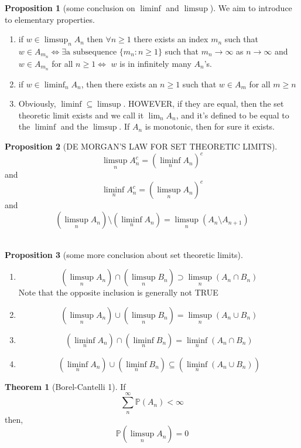 \documentclass[12pt]{article}
\theoremstyle{definition}
\newtheorem{theorem}{Theorem}[section]
\newtheorem{proposition}{Proposition}[theorem]
\begin{document}
\begin{proposition}[some conclusion on $\liminf$ and $\limsup$]
We aim to introduce to elementary properties. 
\begin{enumerate}
	\item if $w \in \limsup_{n} A_n$ then $\forall n \geq 1$ there exists an index $m_n$ such that $w \in A_{m_n} \iff \exists \text{a subsequence } \{m_n \colon n \geq 1\}$ such that $m_n \to \infty$ as $n \to \infty$ and $w \in A_{m_n}$ for all $n \geq 1 \iff$ $w$ is in infinitely many $A_n$'s. 
	\item if $w \in \liminf_{n} A_n$, then there exists an $n \geq 1$ such that $w \in A_m$ for all $m \geq n$
	\item Obviously, $\liminf \subseteq \limsup$. HOWEVER, if they are equal, then the set theoretic limit exists and we call it $\lim_n A_n$, and it's defined to be equal to the $\liminf$ and the $\limsup$. If $A_n$ is monotonic, then for sure it exists.
\end{enumerate}


	
\end{proposition}
\begin{proposition}[DE MORGAN'S LAW FOR SET THEORETIC LIMITS]
	$$\limsup_n A_n^c = (\liminf_n A_n)^c$$
	and
	$$\liminf_n A_n^c = (\limsup_n A_n)^c$$
	and
	$$(\limsup_n A_n) \setminus (\liminf_n A_n) = \limsup_n (A_n \setminus A_{n+1})$$
	\\
	
\end{proposition}
\begin{proposition}[some more conclusion about set theoretic limits]
	\begin{enumerate}asd
		\item $$(\limsup_n A_n) \cap (\limsup_n B_n) \supset \limsup_n (A_n \cap B_n)$$
		Note that the opposite inclusion is generally not TRUE
		\item $$(\limsup_n A_n) \cup (\limsup_n B_n) = \limsup_n (A_n \cup B_n)$$
		\item $$(\liminf_n A_n) \cap (\liminf_n B_n) = \liminf_n (A_n \cap B_n)$$
		\item $$(\liminf_n A_n) \cup (\liminf_n B_n) \subseteq (\liminf_n (A_n \cup B_n))$$
		
	\end{enumerate}
\end{proposition}
\begin{theorem}[Borel-Cantelli 1]
	If $$\sum_{n}^\infty \mathbb{P}(A_n) < \infty$$ then, $$\mathbb{P}(\limsup_n A_n) = 0$$
\end{theorem}
\end{document}
